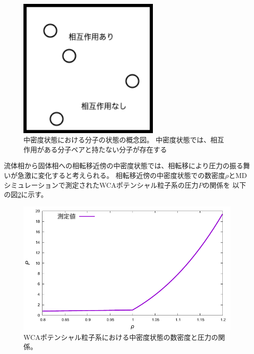 \documentclass[titlepage]{jsreport}
\begin{document}
{{{\begin{figure}[htbp]
    \begin{center}
        \includegraphics[width=7cm]{fig/middledensity.png}
    \end{center}
    \caption{中密度状態における分子の状態の概念図。
    中密度状態では、相互作用がある分子ペアと持たない分子が存在する}
    \label{fig:middledensity.png}
\end{figure}


流体相から固体相への相転移近傍の中密度状態では、相転移により圧力の振る舞いが急激に変化すると考えられる。
相転移近傍の中密度状態での数密度$\rho$とMDシミュレーションで測定されたWCAポテンシャル粒子系の圧力$P$の関係を
以下の図\ref{fig:middleden_den-pre}に示す。

\newpage
\begin{figure}[htbp]
    \begin{center}
        \includegraphics[width=14cm]{fig/middleden_den-pre.pdf}
    \end{center}
    \caption{WCAポテンシャル粒子系における中密度状態の数密度と圧力の関係。}
    \label{fig:middleden_den-pre}
\end{figure}


}}}
\end{document}
